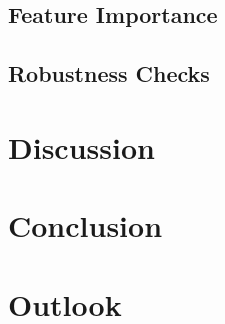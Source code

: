 \subsection{Feature Importance}\label{feature-importance}

\subsection{Robustness Checks}\label{robustness-checks}

\newpage
\section{Discussion}\label{discussion}

\newpage
\section{Conclusion}\label{conclusion}

\newpage
\section{Outlook}\label{outlook}

